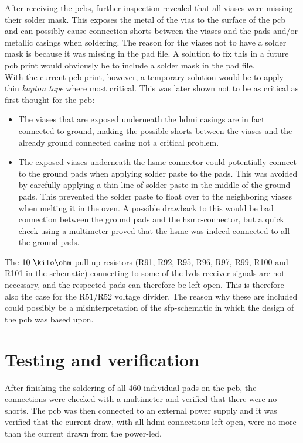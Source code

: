 \documentclass[main.tex]{subfiles}
\begin{document}
After receiving the \glspl{pcb}, further inspection revealed that all viases were missing their solder mask. This exposes the metal of the vias to the surface of the \gls{pcb} and can possibly cause connection shorts between the viases and the pads and/or metallic casings when soldering. The reason for the viases not to have a solder mask is because it was missing in the pad file. A solution to fix this in a future \gls{pcb} print would obviously be to include a solder mask in the pad file.\\
With the current \gls{pcb} print, however, a temporary solution would be to apply thin \textit{kapton tape} where most critical. This was later shown not to be as critical as first thought for the \gls{pcb}: \\
\begin{itemize}
\item The viases that are exposed underneath the \gls{hdmi} casings are in fact connected to ground, making the possible shorts between the viases and the already ground connected casing not a critical problem. \\
\item The exposed viases underneath the \gls{hsmc}-connector could potentially connect to the ground pads when applying solder paste to the pads. This was avoided by carefully applying  a thin line of solder paste in the middle of the ground pads. This prevented the solder paste to float over to the neighboring viases when melting it in the oven. A possible drawback to this would be bad connection between the ground pads and the \gls{hsmc}-connector, but a quick check using a multimeter proved that the \gls{hsmc} was indeed connected to all the ground pads.
\end{itemize}

The $10~\kilo\ohm$ pull-up resistors (R91, R92, R95, R96, R97, R99, R100 and R101 in the schematic) connecting to some of the \gls{lvds} receiver signals are not necessary, and the respected pads can therefore be left open. This is therefore also the case for the R51/R52 voltage divider. The reason why these are included could possibly be a misinterpretation of the \gls{sfp}-schematic in which the design of the \gls{pcb} was based upon. 



\section{Testing and verification}
After finishing the soldering of all 460 individual pads on the \gls{pcb}, the connections were checked with a multimeter and verified that there were no shorts. The \gls{pcb} was then connected to an external power supply and it was verified that the current draw, with all \gls{hdmi}-connections left open, were no more than the current drawn from the power-\acrshort{led}. \\
\end{document}
